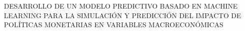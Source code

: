 \begin{center}
	\vspace*{10cm}
	{DESARROLLO DE UN MODELO PREDICTIVO BASADO EN MACHINE LEARNING PARA LA SIMULACIÓN Y PREDICCIÓN DEL IMPACTO DE POLÍTICAS MONETARIAS EN VARIABLES MACROECONÓMICAS}
\end{center}

